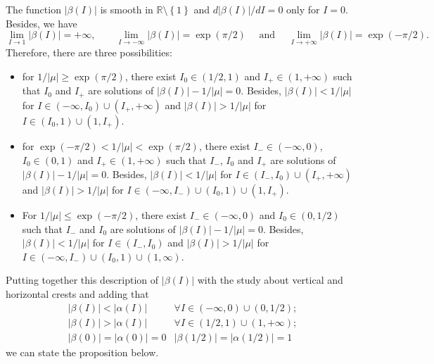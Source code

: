 \documentclass[a4paper,10pt]{article}
\theoremstyle{definition}
\begin{document}
The function $\left|\beta(I)\right|$ is smooth in $\mathbb{R}\setminus\left\{1\right\}$ and $d\left|\beta(I)\right|/dI = 0$ only for $I=0$.
Besides, we have
\begin{equation*}
\lim_{I\rightarrow 1}\left|\beta(I)\right| = +\infty, \quad\quad \lim_{I\rightarrow - \infty}\left|\beta(I)\right| = \exp(\pi/2)\quad\text{ and }\quad \lim_{I\rightarrow +\infty}\left|\beta(I)\right| = \exp( -\pi/2).
\end{equation*}
Therefore, there are three possibilities:
\begin{itemize}
\item for $1/\left|\mu\right| \geq \exp(\pi/2)$, there exist $I_0\in(1/2 , 1)$ and $I_+\in(1,+\infty)$ such that $I_0$ and $I_+$ are solutions of $\left|\beta(I)\right| - 1/\left|\mu\right|=0$.
Besides, $\left|\beta(I)\right|<1/\left|\mu\right|$ for $I\in(-\infty , I_0)\cup(I_+,+\infty)$ and $\left|\beta(I)\right|> 1/\left|\mu\right|$ for $I\in(I_0 , 1)\cup(1 , I_+)$.
\item for $\exp(-\pi/2 )< 1/\left|\mu\right| < \exp(\pi/2)$, there exist $I_-\in(-\infty , 0)$, $I_0\in(0 , 1)$ and $I_+\in(1,+\infty)$ such that $I_-$, $I_0$ and $I_+$ are solutions of $\left|\beta(I)\right| - 1/\left|\mu\right|=0$.
Besides, $\left|\beta(I)\right|<1/\left|\mu\right|$ for $I\in(I_- , I_0)\cup(I_+,+\infty)$ and $\left|\beta(I)\right|> 1/\left|\mu\right|$ for $I\in(-\infty,I_-)\cup(I_0 , 1)\cup(1 , I_+)$.
\item For $ 1/\left|\mu\right| \leq \exp(-\pi/2)$, there exist $I_-\in(-\infty , 0)$ and $I_0\in(0 , 1/2)$ such that $I_-$ and $I_0$ are solutions of $\left|\beta(I)\right| - 1/\left|\mu\right|=0$.
Besides, $\left|\beta(I)\right|<1/\left|\mu\right|$ for $I\in(I_- , I_0)$ and $\left|\beta(I)\right|> 1/\left|\mu\right|$ for $I\in(-\infty,I_-)\cup(I_0 , 1)\cup(1 , \infty)$.
\end{itemize}

Putting together this description of $\left|\beta(I)\right|$ with the study about vertical and horizontal crests and adding that
\begin{eqnarray*}
\left|\beta(I)\right| < \left|\alpha(I)\right| &  \forall I\in(-\infty , 0)\cup(0,1/2);\\
\left|\beta(I)\right| > \left|\alpha(I)\right| &  \forall I\in(1/2 , 1)\cup(1,+\infty);\\
\left|\beta(0)\right| = \left|\alpha(0)\right| = 0&  \left|\beta(1/2)\right| = \left|\alpha(1/2)\right| = 1
\end{eqnarray*}
we can state the proposition below.
\end{document}

